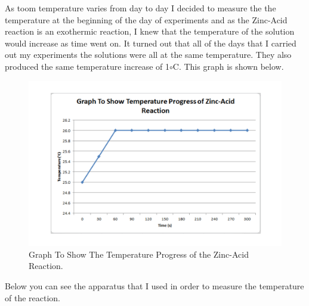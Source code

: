 As toom temperature varies from day to day I decided to measure the the temperature at the beginning of the day of experiments and as the Zinc-Acid reaction is an exothermic reaction, I knew that the temperature of the solution would increase as time went on. It turned out that all of the days that I carried out my experiments the solutions were all at the same temperature. They also produced the same temperature increase of 1$\circ$C. This graph is shown below.


\begin{figure}[H]
    \includegraphics[width=\textwidth]{./preliminarywork/graphs/Temperature.pdf}
    \caption{Graph To Show The Temperature Progress of the Zinc-Acid Reaction.} \label{fig:Temperature Graph}
\end{figure}

Below you can see the apparatus that I used in order to measure the temperature of the reaction.

